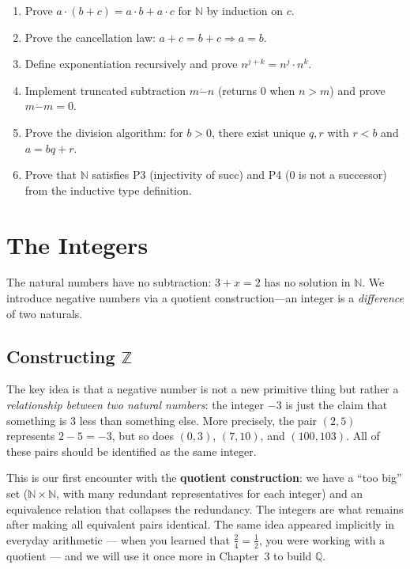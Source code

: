 \documentclass[12pt, openany]{book}
\theoremstyle{plain}
\theoremstyle{definition}
\theoremstyle{remark}
\newcommand{\N}{\mathbb{N}}
\newcommand{\Z}{\mathbb{Z}}
\newcommand{\Q}{\mathbb{Q}}
\begin{document}
\begin{exbox}
\begin{enumerate}
  \item Prove $a \cdot (b + c) = a \cdot b + a \cdot c$ for $\N$ by induction on $c$.
  \item Prove the cancellation law: $a + c = b + c \Rightarrow a = b$.
  \item Define exponentiation recursively and prove $n^{j+k} = n^j \cdot n^k$.
  \item Implement truncated subtraction $m \mathbin{\dot{-}} n$ (returns $0$ when $n > m$) and prove $m \mathbin{\dot{-}} m = 0$.
  \item Prove the division algorithm: for $b > 0$, there exist unique $q, r$ with $r < b$ and $a = bq + r$.
  \item Prove that $\N$ satisfies P3 (injectivity of succ) and P4 ($0$ is not a successor) from the inductive type definition.
\end{enumerate}
\end{exbox}
\color{black}

\chapter{The Integers}
\color{black}

The natural numbers have no subtraction: $3 + x = 2$ has no solution in $\N$. We introduce negative numbers via a quotient construction---an integer is a \emph{difference} of two naturals.

\section{Constructing \texorpdfstring{$\Z$}{Z}}

The key idea is that a negative number is not a new primitive thing but rather a \emph{relationship between two natural numbers}: the integer $-3$ is just the claim that something is $3$ less than something else.  More precisely, the pair $(2, 5)$ represents $2 - 5 = -3$, but so does $(0, 3)$, $(7, 10)$, and $(100, 103)$.  All of these pairs should be identified as the same integer.

This is our first encounter with the \textbf{quotient construction}: we have a ``too big'' set ($\N \times \N$, with many redundant representatives for each integer) and an equivalence relation that collapses the redundancy.  The integers are what remains after making all equivalent pairs identical.  The same idea appeared implicitly in everyday arithmetic --- when you learned that $\frac{2}{4} = \frac{1}{2}$, you were working with a quotient --- and we will use it once more in Chapter~3 to build $\Q$.
\end{document}
